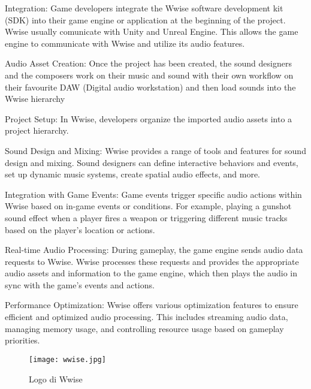 \begin{compactitem}
	\item Integration: Game developers integrate the Wwise software development kit (SDK) into their game engine or application at the beginning of the project. Wwise usually comunicate with Unity and Unreal Engine. This allows the game engine to communicate with Wwise and utilize its audio features.
		
	\item Audio Asset Creation: Once the project has been created, the sound designers and the composers work on their music and sound with their own workflow on their favourite DAW (Digital audio workstation) and then load sounds into the Wwise hierarchy
		
	\item Project Setup: In Wwise, developers organize the imported audio assets into a project hierarchy.
		
	\item Sound Design and Mixing: Wwise provides a range of tools and features for sound design and mixing. Sound designers can define interactive behaviors and events, set up dynamic music systems, create spatial audio effects, and more.
		
	\item Integration with Game Events: Game events trigger specific audio actions within Wwise based on in-game events or conditions. For example, playing a gunshot sound effect when a player fires a weapon or triggering different music tracks based on the player's location or actions.
		
	\item Real-time Audio Processing: During gameplay, the game engine sends audio data requests to Wwise. Wwise processes these requests and provides the appropriate audio assets and information to the game engine, which then plays the audio in sync with the game's events and actions.
		
	\item Performance Optimization: Wwise offers various optimization features to ensure efficient and optimized audio processing. This includes streaming audio data, managing memory usage, and controlling resource usage based on gameplay priorities.
\end{compactitem}

\begin{figure}
	\begin{center}
		\texttt{[image: wwise.jpg]}
		\caption{Logo di Wwise}
	\end{center}
\end{figure}

